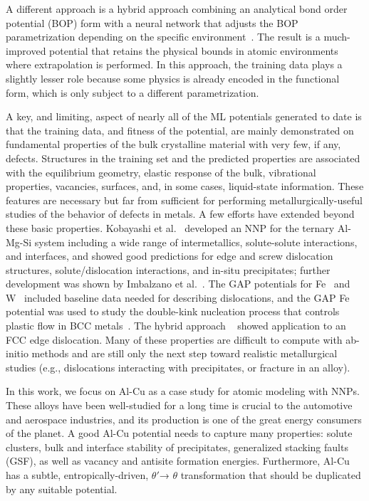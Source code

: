 \documentclass{article}
\begin{document}
A different approach is a hybrid approach combining an analytical bond order potential (BOP)
form with a neural network that adjusts the BOP parametrization depending on the specific environment~\cite{PurjaPun0PhysicallyMaterials}.
The result is a much-improved potential that retains the physical bounds in atomic environments where extrapolation is performed.
In this approach, the training data plays a slightly lesser role because some physics is already encoded in the functional form, which is only subject to a different parametrization.

A key, and limiting, aspect of nearly all of the ML potentials generated to date is that the training data, and fitness of the potential, are mainly demonstrated on fundamental properties of the bulk crystalline material with very few, if any, defects.
Structures in the training set and the predicted properties are associated with the equilibrium geometry, elastic response of the bulk, vibrational properties, vacancies, surfaces, and, in some cases, liquid-state information.
These features are necessary but far from sufficient for performing metallurgically-useful studies of the behavior of defects in metals.
A few efforts have extended beyond these basic properties.
Kobayashi et al.~\cite{Kobayashi2017} developed an NNP for the ternary Al-Mg-Si system including a wide range of intermetallics, solute-solute interactions, and interfaces, and showed good predictions for edge and screw dislocation structures, solute/dislocation interactions, and in-situ precipitates; further development was shown by Imbalzano et al.~\cite{Imbalzano2018}.
The GAP potentials for Fe~\cite{Dragoni2018AchievingIron} and W~\cite{Szlachta2014AccuracyTungsten} included baseline data needed for describing dislocations, and the GAP Fe potential was used to study the double-kink nucleation process that controls plastic flow in BCC metals~\cite{Maresca2018}.
The hybrid approach ~\cite{PurjaPun0PhysicallyMaterials} showed application to an FCC edge dislocation.
Many of these properties are difficult to compute with ab-initio methods and are still only the next step toward realistic metallurgical studies (e.g., dislocations interacting with precipitates, or fracture in an alloy).


In this work, we focus on Al-Cu as a case study for atomic modeling with NNPs. These alloys have been well-studied for a long time\cite{Preston1938StructureAlloys} is crucial to the automotive and aerospace industries\cite{Nie2014PhysicalAlloys}, and its production is one of the great energy consumers of the planet\cite{Raabe2019StrategiesMetals}. A good Al-Cu potential needs to capture many properties: solute clusters, bulk and interface stability of precipitates, generalized stacking faults (GSF), as well as vacancy and antisite formation energies. Furthermore, Al-Cu has a subtle, entropically-driven,  $\theta'$→ $\theta$ transformation \cite{Wolverton2001b} that should be duplicated by any suitable potential.
\end{document}

